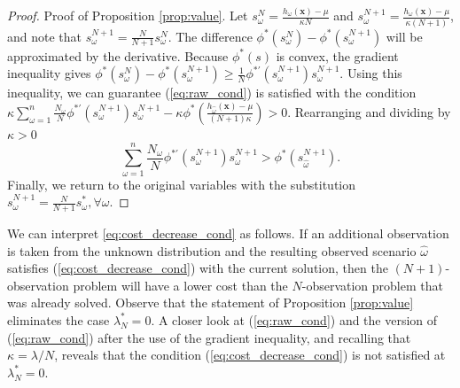 \documentclass[opre,nonblindrev]{informs3} %
\newcommand{\x}{\mathbf{x}}
\begin{document}
\begin{proof}{\sc Proof of Proposition \ref{prop:value}.}
	Let $s^N_\omega = \frac{h_\omega(\x) - \mu}{\kappa N}$ and $s^{N+1}_\omega = \frac{h_\omega(\x) - \mu}{\kappa (N+1)}$, and note that $s^{N+1}_\omega = \tfrac{N}{N+1} s^N_\omega$.
	The difference $\phi^*(s^N_\omega) - \phi^*(s^{N+1}_\omega)$ will be approximated by the derivative.
Because $\phi^*(s)$ is convex, the gradient inequality gives $\phi^*(s^N_\omega) - \phi^*(s^{N+1}_\omega) \geq \frac{1}{N} \phi^{*\prime}(s^{N+1}_\omega) s^{N+1}_\omega$. 
	Using this inequality, we can guarantee (\ref{eq:raw_cond}) is satisfied with the condition $\kappa \sum_{\omega=1}^n \frac{N_\omega}{N} \phi^{*\prime}(s^{N+1}_\omega) s^{N+1}_\omega - \kappa \phi^*\left(\frac{h_{\hat{\omega}}(\x) - \mu}{(N+1)\kappa}\right) > 0$.
	 Rearranging and dividing by $\kappa > 0$
	\begin{equation*} %
		\sum_{\omega=1}^n \frac{N_\omega}{N} \phi^{*\prime}(s^{N+1}_\omega) s^{N+1}_\omega > \phi^*(s^{N+1}_{\hat{\omega}}).
	\end{equation*}
	Finally, we return to the original variables with the substitution $s^{N+1}_\omega = \frac{N}{N+1} s^*_\omega, \forall \omega$. 
	\Halmos
\end{proof}

We can interpret \eqref{eq:cost_decrease_cond} as follows. 
If an additional observation is taken from the unknown distribution and the resulting observed scenario $\hat{\omega}$ satisfies (\ref{eq:cost_decrease_cond}) with the current solution, then the $(N+1)$-observation problem will have a lower cost than the $N$-observation problem that was already solved.
Observe that the statement of Proposition \ref{prop:value} eliminates the case $\lambda_N^* = 0$. 
A closer look at (\ref{eq:raw_cond}) and the version of (\ref{eq:raw_cond}) after the use of the gradient inequality, and recalling that $\kappa = \lambda /N$, reveals that the condition (\ref{eq:cost_decrease_cond}) is not satisfied at $\lambda_N^* = 0$.  
\end{document}
